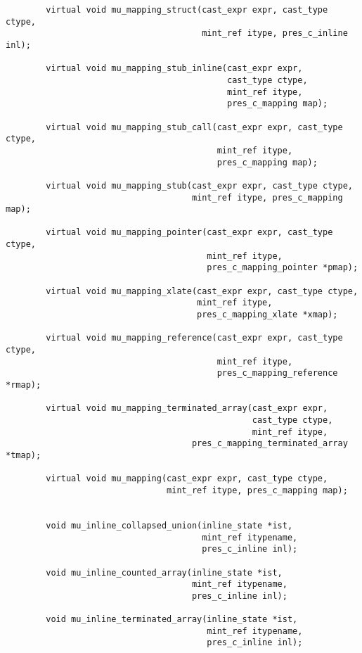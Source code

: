 \begin{verbatim}
        virtual void mu_mapping_struct(cast_expr expr, cast_type ctype,
                                       mint_ref itype, pres_c_inline inl);

        virtual void mu_mapping_stub_inline(cast_expr expr,
                                            cast_type ctype,
                                            mint_ref itype,
                                            pres_c_mapping map);

        virtual void mu_mapping_stub_call(cast_expr expr, cast_type ctype,
                                          mint_ref itype,
                                          pres_c_mapping map);

        virtual void mu_mapping_stub(cast_expr expr, cast_type ctype,
                                     mint_ref itype, pres_c_mapping map);

        virtual void mu_mapping_pointer(cast_expr expr, cast_type ctype,
                                        mint_ref itype,
                                        pres_c_mapping_pointer *pmap);

        virtual void mu_mapping_xlate(cast_expr expr, cast_type ctype,
                                      mint_ref itype,
                                      pres_c_mapping_xlate *xmap);

        virtual void mu_mapping_reference(cast_expr expr, cast_type ctype,
                                          mint_ref itype,
                                          pres_c_mapping_reference *rmap);

        virtual void mu_mapping_terminated_array(cast_expr expr,
                                                 cast_type ctype,
                                                 mint_ref itype,
                                     pres_c_mapping_terminated_array *tmap);

        virtual void mu_mapping(cast_expr expr, cast_type ctype,
                                mint_ref itype, pres_c_mapping map);


        void mu_inline_collapsed_union(inline_state *ist,
                                       mint_ref itypename,
                                       pres_c_inline inl);

        void mu_inline_counted_array(inline_state *ist,
                                     mint_ref itypename,
                                     pres_c_inline inl);

        void mu_inline_terminated_array(inline_state *ist,
                                        mint_ref itypename,
                                        pres_c_inline inl);


\end{verbatim}
